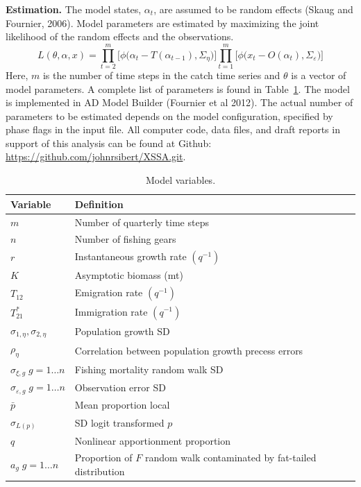 \documentclass[12pt,letterpaper,twoside]{article}
\newcommand\help[1]{\color{Magenta}{\it #1 }\normalcolor}
\begin{document}
{\bf Estimation.} The model states, $\alpha_t$, are assumed to be random
effects (Skaug and Fournier, 2006). Model parameters are estimated by
maximizing the joint likelihood of the random
effects and the observations.
\begin{equation}
L(\theta,\alpha,x)=
\prod^m_{t=2}\big[\phi\big(\alpha_t-T(\alpha_{t-1}), \Sigma_\eta\big)\big]
\prod^m_{t=1}\big[\phi\big(x_t-O(\alpha_t), \Sigma_\varepsilon\big)\big]
\end{equation}
Here, $m$ is the number of time steps in the catch time series and
$\theta$ is a vector of model parameters. A complete list of
parameters is found in Table~\ref{tab:allvars}. 
The model is implemented in AD Model Builder (Fournier et al 2012).
The actual number of
parameters to be estimated depends on the model configuration,
specified by phase flags in the input file. 
All computer code, data files, and draft reports in support of this
analysis can be found at Github:\linebreak
\url{https://github.com/johnrsibert/XSSA.git}.


\begin{table}
\caption{Model variables.
\label{tab:allvars}}
\begin{center}
\begin{tabular}{ll}
\hline
Variable & Definition\\
\hline
\hline
$m$ & Number of quarterly time steps\\
$n$ & Number of fishing gears\\
\hline
\hline
$r$ & Instantaneous growth rate $(q^{-1})$\\
$K$ & Asymptotic biomass (mt) \\
$T_{12}$ & Emigration rate $(q^{-1})$\\
$T^*_{21}$& Immigration rate $(q^{-1})$\\
$\sigma_{1,\eta}, \sigma_{2,\eta}$ & Population growth SD\\
$\rho_\eta$ & Correlation between population growth precess errors\\
$\sigma_{\xi,g}\; g=1\ldots n$ & Fishing mortality random walk SD\\
$\sigma_{\varepsilon,g}\; g=1\ldots n$ & Observation error SD \\
$\bar{p}$ & Mean proportion local\\
$\sigma_{L(p)}$ & SD logit transformed $p$\\
$q$ & Nonlinear apportionment proportion\\
$a_g\; g=1\ldots n$ & Proportion of $F$ random walk contaminated by 
fat-tailed distribution\\
\hline
\end{tabular}
\end{center}
\end{table}

\end{document}
